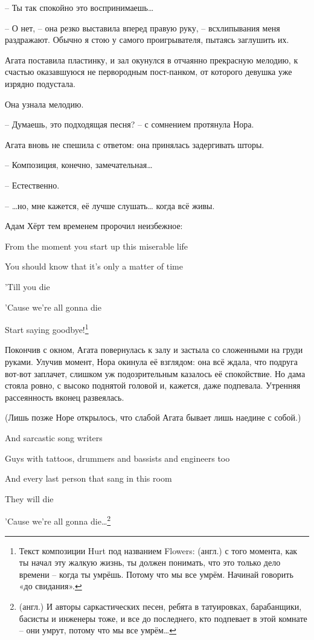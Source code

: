 \documentclass[
  a5paperpaper,
  DIV=11,
  numbers=noendperiod]{scrreprt}
\begin{document}
-- Ты так спокойно это воспринимаешь\ldots{}

-- О нет, -- она резко выставила вперед правую руку, -- всхлипывания
меня раздражают. Обычно я стою у самого проигрывателя, пытаясь заглушить
их.

Агата поставила пластинку, и зал окунулся в отчаянно прекрасную мелодию,
к счастью оказавшуюся не первородным пост-панком, от которого девушка
уже изрядно подустала.

Она узнала мелодию.

-- Думаешь, это подходящая песня? -- с сомнением протянула Нора.

Агата вновь не спешила с ответом: она принялась задергивать шторы.

-- Композиция, конечно, замечательная\ldots{}

-- Естественно.

-- \ldots но, мне кажется, её лучше слушать\ldots{} когда всё живы.

Адам Хёрт тем временем пророчил неизбежное:

From the moment you start up this miserable life

You should know that it's only a matter of time

'Till you die

'Cause we're all gonna die

Start saying goodbye!\footnote{Текст композиции Hurt под названием
  Flowers: (англ.) с того момента, как ты начал эту жалкую жизнь, ты
  должен понимать, что это только дело времени -- когда ты умрёшь.
  Потому что мы все умрём. Начинай говорить «до свидания».}

Покончив с окном, Агата повернулась к залу и застыла со сложенными на
груди руками. Улучив момент, Нора окинула её взглядом: она всё ждала,
что подруга вот-вот заплачет, слишком уж подозрительным казалось её
спокойствие. Но дама стояла ровно, с высоко поднятой головой и, кажется,
даже подпевала. Утренняя рассеянность вконец развеялась.

(Лишь позже Норе открылось, что слабой Агата бывает лишь наедине с
собой.)

And sarcastic song writers

Guys with tattoos, drummers and bassists and engineers too

And every last person that sang in this room

They will die

'Cause we're all gonna die\ldots{}\footnote{(англ.) И авторы
  саркастических песен, ребята в татуировках, барабанщики, басисты и
  инженеры тоже, и все до последнего, кто подпевает в этой комнате --
  они умрут, потому что мы все умрём\ldots{}}
\end{document}
